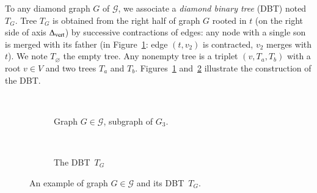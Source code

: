 \documentclass[preprint]{elsarticle}
\newcommand{\set}[1]{\left\{ #1 \right\}}
\newcommand{\card}[1]{\left| #1 \right|}
\newcommand{\mcalg}{\mathcal{G}}
\newcommand{\mts}{MS}
\newcommand{\deltavert}{\Delta_{\mbox{\scriptsize{vert}}}}
\newcommand{\ebt}{DBT}
\begin{document}
%

To any diamond graph $G$ of $\mcalg$, we associate a \textit{diamond binary tree} (\ebt ) noted $T_G$. Tree $T_G$ is obtained from the right half of graph $G$ rooted in $t$ (on the right side of axis $\deltavert$) by successive contractions of edges: any node with a single son is merged with its father (in Figure~\ref{subfig:ebt_2}: edge $\left(t,v_2\right)$ is contracted, $v_2$ merges with $t$). 
We note $T_\varnothing$ the empty tree. Any nonempty tree is a triplet $(v, T_a, T_b)$ with a root $v \in V$ and two trees $T_a$ and $T_b$. Figures~\ref{subfig:ebt_2} and~\ref{subfig:ebt_3} illustrate the construction of the \ebt . 

\begin{figure}[h]
\centering
~
\begin{subfigure}[b]{0.46\columnwidth}
\centering
\scalebox{.42}{}
\caption{Graph $G \in \mcalg$, subgraph of $G_3$.}
\label{subfig:ebt_2}
\end{subfigure}
~
\begin{subfigure}[b]{0.46\columnwidth}
\centering
\scalebox{.58}{}
\caption{The \ebt ~$T_G$}
\label{subfig:ebt_3}
\end{subfigure}
\caption{An example of graph $G \in \mcalg$ and its \ebt ~$T_G$.}
\label{fig:ebt}
\end{figure}
\end{document}
